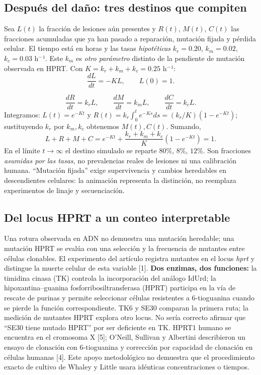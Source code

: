 \documentclass[11pt,a4paper,oneside]{article}
\begin{document}
\subsection{Después del daño: tres destinos que compiten}\label{despuuxe9s-del-dauxf1o-tres-destinos-que-compiten}

Sea \(L(t)\) la fracción de lesiones aún presentes y \(R(t)\), \(M(t)\), \(C(t)\) las fracciones acumuladas que ya han pasado a reparación, mutación fijada y pérdida celular. El tiempo está en horas y las tasas \emph{hipotéticas} \(k_r=0.20\), \(k_m=0.02\), \(k_c=0.03\) h\(^{-}\)¹. Este \(k_m\) es \emph{otro parámetro} distinto de la pendiente de mutación observada en HPRT. Con \(K=k_r+k_m+k_c=0.25\) h\(^{-}\)¹: \[\frac{dL}{dt}=-KL,\qquad L(0)=1.\]

\[\frac{dR}{dt}=k_rL,\qquad \frac{dM}{dt}=k_mL,\qquad \frac{dC}{dt}=k_cL.\] Integramos: \(L(t)=e^{-Kt}\) y \(R(t)=k_r\int_0^t e^{-Ks}ds=(k_r/K)(1-e^{-Kt})\); sustituyendo \(k_r\) por \(k_m,k_c\) obtenemos \(M(t),C(t)\). Sumando, \[L+R+M+C=e^{-Kt}+\frac{k_r+k_m+k_c}{K}(1-e^{-Kt})=1.\] En el límite \(t\to\infty\) el destino simulado se reparte \(80\%\), \(8\%\), \(12\%\). Son fracciones \emph{asumidas por las tasas}, no prevalencias reales de lesiones ni una calibración humana. ``Mutación fijada'' exige supervivencia y cambios heredables en descendientes celulares: la animación representa la distinción, no reemplaza experimentos de linaje y secuenciación.

\subsection{Del locus HPRT a un conteo interpretable}\label{sec:hprt}

Una rotura observada en ADN no demuestra una mutación heredable; una mutación HPRT se evalúa con una selección y la frecuencia de mutantes entre células clonables. El experimento del artículo registra mutantes en el locus \emph{hprt} y distingue la muerte celular de esta variable {[}1{]}. \textbf{Dos enzimas, dos funciones:} la timidina cinasa (TK) controla la incorporación del análogo IdUrd; la hipoxantina--guanina fosforribosiltransferasa (HPRT) participa en la vía de rescate de purinas y permite seleccionar células resistentes a 6-tioguanina cuando se pierde la función correspondiente. TK6 y SE30 comparan la primera ruta; la medición de mutantes HPRT explora otro locus. No sería correcto afirmar que ``SE30 tiene mutado HPRT'' por ser deficiente en TK. HPRT1 humano se encuentra en el cromosoma X {[}5{]}; O'Neill, Sullivan y Albertini describieron un ensayo de clonación con 6-tioguanina y corrección por capacidad de clonación en células humanas {[}4{]}. Este apoyo metodológico no demuestra que el procedimiento exacto de cultivo de Whaley y Little usara idénticas concentraciones o tiempos.
\end{document}
